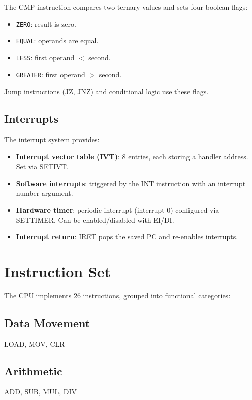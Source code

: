 \documentclass[11pt,a4paper]{article}
\begin{document}
The CMP instruction compares two ternary values and sets four boolean flags:
\begin{itemize}
  \item \texttt{ZERO}: result is zero.
  \item \texttt{EQUAL}: operands are equal.
  \item \texttt{LESS}: first operand $<$ second.
  \item \texttt{GREATER}: first operand $>$ second.
\end{itemize}
Jump instructions (JZ, JNZ) and conditional logic use these flags.

\subsection{Interrupts}

The interrupt system provides:

\begin{itemize}
  \item \textbf{Interrupt vector table (IVT)}: 8 entries, each storing a
        handler address.  Set via SETIVT.
  \item \textbf{Software interrupts}: triggered by the INT instruction with an
        interrupt number argument.
  \item \textbf{Hardware timer}: periodic interrupt (interrupt 0) configured
        via SETTIMER.  Can be enabled/disabled with EI/DI.
  \item \textbf{Interrupt return}: IRET pops the saved PC and re-enables
        interrupts.
\end{itemize}

\section{Instruction Set}
\label{sec:isa}

The CPU implements 26 instructions, grouped into functional categories:

\subsection{Data Movement}
LOAD, MOV, CLR

\subsection{Arithmetic}
ADD, SUB, MUL, DIV
\end{document}
